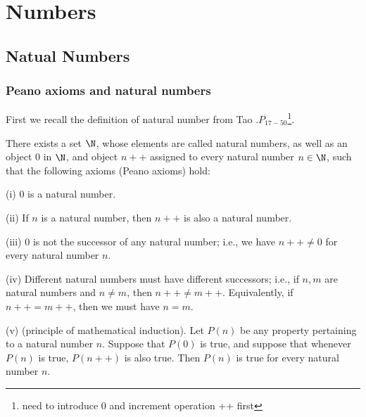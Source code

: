 
\chapter{Numbers}\label{cha:numbers}

\section{Natual Numbers}

\subsection{Peano axioms and natural numbers}

First we recall the definition of natural number from Tao \cite{Tao_2006_1}.$P_{17-50}$\footnote{need to introduce 0 and increment operation ++ first}.





\begin{axiom}\label{axm:natural_number}
There exists a set $\N$, whose elements are called natural numbers, as well as an object 0 in $\N$, and object $n++$ assigned to every natural number $n\in\N$, such that the following axioms (Peano axioms) hold:
\ben
\item [(i)] 0 is a natural number.
\item [(ii)] If $n$ is a natural number, then $n++$ is also a natural number.
\item [(iii)] 0 is not the successor of any natural number; i.e., we have $n++\neq 0$ for every natural number $n$.
\item [(iv)] Different natural numbers must have different successors; i.e., if $n,m$ are natural numbers and $n\neq m$, then $n++ \neq m++$. Equivalently, if $n++ = m++$, then we must have $n=m$.
\item [(v)] (principle of mathematical induction). Let $P(n)$ be any property pertaining to a natural number $n$. Suppose that $P(0)$ is true, and suppose that whenever $P(n)$ is true, $P(n++)$ is also true. Then $P(n)$ is true for every natural number $n$.
\een%
\end{axiom}

